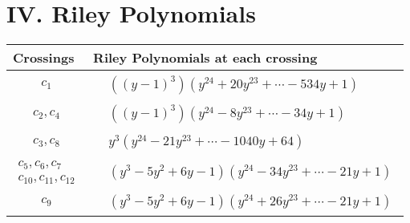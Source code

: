 \documentclass[1p]{elsarticle_modified}
\theoremstyle{definition}
\begin{document}
\centering \section*{ IV. Riley Polynomials}
\begin{tabular}{m{50pt}|m{274pt}}
Crossings & \hspace{64pt}Riley Polynomials at each crossing \\
\hline $$\begin{aligned}c_{1}\end{aligned}$$&$\begin{aligned}
&((y-1)^3)(y^{24}+20 y^{23}+\cdots-534 y+1)
\end{aligned}$\\
\hline $$\begin{aligned}c_{2},c_{4}\end{aligned}$$&$\begin{aligned}
&((y-1)^3)(y^{24}-8 y^{23}+\cdots-34 y+1)
\end{aligned}$\\
\hline $$\begin{aligned}c_{3},c_{8}\end{aligned}$$&$\begin{aligned}
&y^3(y^{24}-21 y^{23}+\cdots-1040 y+64)
\end{aligned}$\\
\hline $$\begin{aligned}c_{5},c_{6},c_{7}\\c_{10},c_{11},c_{12}\end{aligned}$$&$\begin{aligned}
&(y^3-5 y^2+6 y-1)(y^{24}-34 y^{23}+\cdots-21 y+1)
\end{aligned}$\\
\hline $$\begin{aligned}c_{9}\end{aligned}$$&$\begin{aligned}
&(y^3-5 y^2+6 y-1)(y^{24}+26 y^{23}+\cdots-21 y+1)
\end{aligned}$\\
\hline
\end{tabular}
\vskip 2pc
\end{document}
